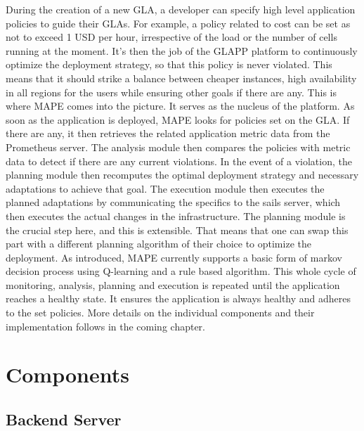 \documentclass{seal_thesis}
\begin{document}
During the creation of a new GLA, a developer can specify high level application policies to guide their GLAs. 
For example, a policy related to cost can be set as not to exceed 1 USD per hour, irrespective of the load or the number of cells running at the moment. 
It's then the job of the GLAPP platform to continuously optimize the deployment strategy, so that this policy is never violated. 
This means that it should strike a balance between cheaper instances, high availability in all regions for the users while ensuring other goals if there are any. 
This is where MAPE comes into the picture. 
It serves as the nucleus of the platform. 
As soon as the application is deployed, MAPE looks for policies set on the GLA. 
If there are any, it then retrieves the related application metric data from the Prometheus server. 
The analysis module then compares the policies with metric data to detect if there are any current violations. 
In the event of a violation, the planning module then recomputes the optimal deployment strategy and necessary adaptations to achieve that goal. 
The execution module then executes the planned adaptations by communicating the specifics to the sails server, which then executes the actual changes in the infrastructure. 
The planning module is the crucial step here, and this is extensible. 
That means that one can swap this part with a different planning algorithm of their choice to optimize the deployment. 
As introduced, MAPE currently supports a basic form of markov decision process using Q-learning and a rule based algorithm. 
This whole cycle of monitoring, analysis, planning and execution is repeated until the application reaches a healthy state. 
It ensures the application is always healthy and adheres to the set policies. 
More details on the individual components and their implementation follows in the coming chapter.


\chapter{Components}\label{ch:components}

\section{Backend Server}
\end{document}
